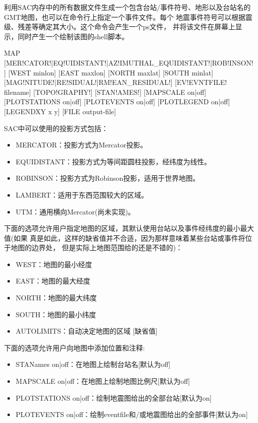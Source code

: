 \label{cmd:map}

利用SAC内存中的所有数据文件生成一个包含台站/事件符号、地形以及台站名的
GMT地图，也可以在命令行上指定一个事件文件。每个
地震事件符号可以根据震级、残差等确定其大小。这个命令会产生一个ps文件，
并将该文件在屏幕上显示，同时产生一个绘制该图的shell脚本。

\begin{SACSTX}
MAP [MER!CATOR!|EQ!UIDISTANT!|AZ!IMUTHAL_EQUIDISTANT!|ROB!INSON!]
    [WEST minlon] [EAST maxlon] [NORTH maxlat] [SOUTH minlat]
    [MAG!NITUDE!|RE!SIDUAL!|RM!EAN_RESIDUAL!] [EV!EVNTFILE! filename]
    [TOPO!GRAPHY!] [STAN!AMES!] [MAPSCALE on|off] [PLOTSTATIONS on|off]
    [PLOTEVENTS on|off] [PLOTLEGEND on|off] [LEGENDXY x y]
    [FILE output-file]
\end{SACSTX}

SAC中可以使用的投影方式包括：
\begin{itemize}
\item MERCATOR：投影方式为Mercator投影。
\item EQUIDISTANT：投影方式为等间距圆柱投影，经纬度为线性。
\item ROBINSON：投影方式为Robinson投影，适用于世界地图。
\item LAMBERT：适用于东西范围较大的区域。
\item UTM：通用横向Mercator(尚未实现)。
\end{itemize}

下面的选项允许用户指定地图的区域，其默认使用台站以及事件经纬度的最小最大值(如果
真是如此，这样的缺省值并不合适，因为那样意味着某些台站或事件将位于地图的边界处，
但是实际上地图范围给的还是不错的)：
\begin{itemize}
\item WEST：地图的最小经度
\item EAST：地图的最大经度
\item NORTH：地图的最大纬度
\item SOUTH：地图的最小纬度
\item AUTOLIMITS：自动决定地图的区域 [缺省值]
\end{itemize}

下面的选项允许用户向地图中添加位置和注释:
\begin{itemize}
\item STANames on|off：在地图上绘制台站名[默认为off]
\item MAPSCALE on|off：在地图上绘制地图比例尺[默认为off]
\item PLOTSTATIONS on|off：绘制地震图给出的全部台站[默认为on]
\item PLOTEVENTS on|off：绘制eventfile和/或地震图给出的全部事件[默认为on]
\end{itemize}

